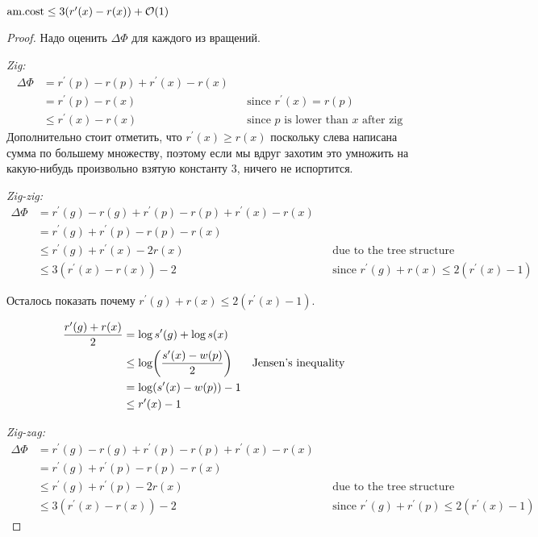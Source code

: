 \begin{theorem}
    $\text{am.cost} \leq 3(r^\prime(x) - r(x)) + \mathcal{O}(1)$
\end{theorem}
\begin{proof}
    Надо оценить $\Delta\Phi$ для каждого из вращений.

    {\it Zig:}
    \begin{align*}
        \Delta\Phi & = r^\prime(p) - r(p) + r^\prime(x) - r(x) \\
        & = r^\prime(p) - r(x) && \text{since $r^\prime(x) = r(p)$} \\
        & \leq r^\prime(x) - r(x) && \text{since $p$ is lower than $x$ after zig}
    \end{align*}
    Дополнительно стоит отметить, что $r^\prime(x) \geq r(x)$ поскольку слева написана сумма по большему множеству, поэтому если мы вдруг захотим это умножить на какую-нибудь произвольно взятую константу $3$, ничего не испортится.

    {\it Zig-zig:}
    \begin{align*}
        \Delta\Phi & = r^\prime(g) - r(g) + r^\prime(p) - r(p) + r^\prime(x) - r(x) \\
        & = r^\prime(g) + r^\prime(p) - r(p) - r(x) \\
        & \leq r^\prime(g) + r^\prime(x) - 2 r(x) && \text{due to the tree structure} \\
        & \leq 3 (r^\prime(x) - r(x)) - 2 && \text{since $r^\prime(g) + r(x) \leq 2(r^\prime(x) - 1)$}
    \end{align*}

    Осталось показать почему $r^\prime(g) + r(x) \leq 2(r^\prime(x) - 1)$.

    \begin{align*}
        \frac{r^\prime(g) + r(x)}{2} & = \log s^\prime(g) + \log s(x) \\
        & \leq \log \parens*{ \frac{s^\prime(x) - w(p)}{2} } && \text{Jensen's inequality} \\
        & = \log \parens*{s^\prime (x) - w(p)} - 1 \\
        & \leq r^\prime(x) - 1
    \end{align*}

    {\it Zig-zag:}
    \begin{align*}
        \Delta\Phi & = r^\prime(g) - r(g) + r^\prime(p) - r(p) + r^\prime(x) - r(x) \\
        & = r^\prime(g) + r^\prime(p) - r(p) - r(x) \\
        & \leq r^\prime(g) + r^\prime(p) - 2 r(x) && \text{due to the tree structure} \\
        & \leq 3 (r^\prime(x) - r(x)) - 2 && \text{since $r^\prime(g) + r^\prime(p) \leq 2(r^\prime(x) - 1)$}
    \end{align*}


\end{proof}
